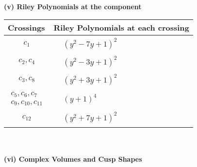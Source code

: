 \documentclass[1p]{elsarticle_modified}
\theoremstyle{definition}
\begin{document}
\newpage\renewcommand{\arraystretch}{1}
\flushleft \textbf{(v) Riley Polynomials at the component}\newline \\
\begin{tabular}{m{50pt}|m{274pt}}
Crossings & \hspace{64pt}Riley Polynomials at each crossing \\
\hline $$\begin{aligned}c_{1}\end{aligned}$$&$\begin{aligned}
&(y^2-7 y+1)^2
\end{aligned}$\\
\hline $$\begin{aligned}c_{2},c_{4}\end{aligned}$$&$\begin{aligned}
&(y^2-3 y+1)^2
\end{aligned}$\\
\hline $$\begin{aligned}c_{3},c_{8}\end{aligned}$$&$\begin{aligned}
&(y^2+3 y+1)^2
\end{aligned}$\\
\hline $$\begin{aligned}c_{5},c_{6},c_{7}\\c_{9},c_{10},c_{11}\end{aligned}$$&$\begin{aligned}
&(y+1)^4
\end{aligned}$\\
\hline $$\begin{aligned}c_{12}\end{aligned}$$&$\begin{aligned}
&(y^2+7 y+1)^2
\end{aligned}$\\
\hline
\end{tabular}\\~\\
\newpage\flushleft \textbf{(vi) Complex Volumes and Cusp Shapes}
\end{document}
